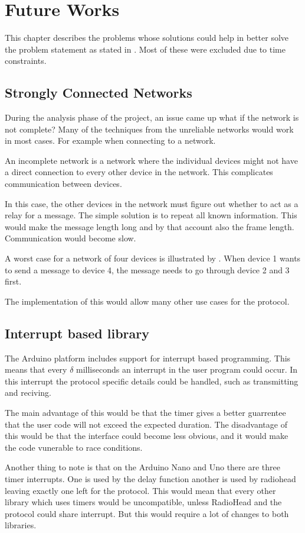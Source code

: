 \chapter{Future Works}
This chapter describes the problems whose solutions could help in better solve the problem statement as stated in . 
Most of these were excluded due to time constraints.

\section{Strongly Connected Networks}
During the analysis phase of the project, an issue came up what if the network is not complete? 
Many of the techniques from the unreliable networks would work in most cases. 
For example when connecting to a network. 

An incomplete network is a network where the individual devices might not have a direct connection to every other device in the network. 
This complicates communication between devices.


In this case, the other devices in the network must figure out whether to act as a relay for a message. 
The simple solution is to repeat all known information. 
This would make the message length long and by that account also the frame length. 
Communication would become slow.

A worst case for a network of four devices is illustrated by .
When device 1 wants to send a message to device 4, the message needs to go through device 2 and 3 first.

The implementation of this would allow many other use cases for the protocol. 

\section{Interrupt based library}

The Arduino platform includes support for interrupt based programming.
This means that every $\delta$ milliseconds an interrupt in the user program could occur.
In this interrupt the protocol specific details could be handled, such as transmitting and reciving.

The main advantage of this would be that the timer gives a better guarrentee that the user code will not exceed the expected duration.
The disadvantage of this would be that the interface could become less obvious, and it would make the code vunerable to race conditions.

Another thing to note is that on the Arduino Nano and Uno there are three timer interrupts.
One is used by the delay function another is used by radiohead leaving exactly one left for the protocol.
This would mean that every other library which uses timers would be uncompatible, unless RadioHead and the protocol could share interrupt.
But this would require a lot of changes to both libraries.